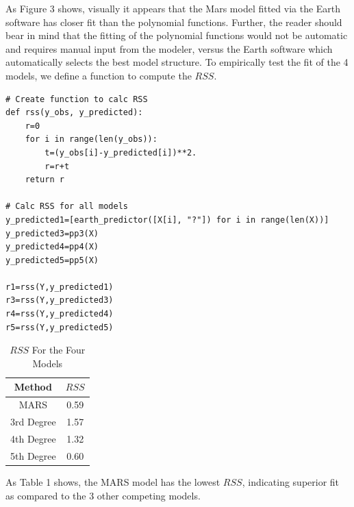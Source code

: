 As Figure 3 shows, visually it appears that the Mars model fitted via the Earth software has closer fit than the polynomial functions. Further, the reader should bear in mind that the fitting of the polynomial functions would not be automatic and requires manual input from the modeler, versus the Earth software which automatically selects the best model structure. To empirically test the fit of the 4 models, we define a function to compute the $RSS$. 

\begin{lstlisting}[caption={Calculate the $RSS$ for the Four Models  },label=lst:expected_times,firstnumber=63]
# Create function to calc RSS
def rss(y_obs, y_predicted):
    r=0
    for i in range(len(y_obs)):
        t=(y_obs[i]-y_predicted[i])**2.
        r=r+t
    return r

# Calc RSS for all models
y_predicted1=[earth_predictor([X[i], "?"]) for i in range(len(X))]
y_predicted3=pp3(X)
y_predicted4=pp4(X)
y_predicted5=pp5(X)

r1=rss(Y,y_predicted1)
r3=rss(Y,y_predicted3)
r4=rss(Y,y_predicted4)
r5=rss(Y,y_predicted5)
\end{lstlisting}

\begin{table}[H]
\caption{$RSS$ For the Four Models}
\centering
\begin{tabular}{c c}
\hline\hline
Method & $RSS$ \\
\hline
MARS & 0.59 \\
3rd Degree & 1.57 \\
4th Degree & 1.32 \\
5th Degree & 0.60 \\
\hline
\end{tabular}
\label{table:nonlin} 
\end{table}

As Table 1 shows, the MARS model has the lowest $RSS$, indicating superior fit as compared to the 3 other competing models.
